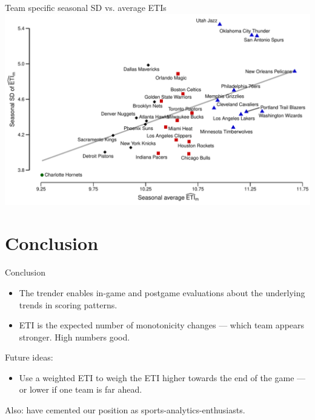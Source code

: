 \documentclass[ignorenonframetext,xcolor=pdflatex,table,dvipsnames,serif]{beamer}
\begin{document}
\begin{frame}{Team specific seasonal SD vs. average ETIs}
\includegraphics[scale=0.5]{fig5.pdf}
\end{frame}

\section{Conclusion}

\begin{frame}{Conclusion}

  \begin{itemize}
  \item The trender enables in-game and postgame evaluations about the underlying trends in scoring patterns.
    \item ETI is the expected number of monotonicity changes --- which team appears stronger. High numbers good.
  \end{itemize}

  Future ideas:
  
  \begin{itemize}
    \item Use a weighted ETI to weigh the ETI higher towards the end of the game --- or lower if one team is far ahead.
  \end{itemize}


  Also: have cemented our position as sports-analytics-enthusiasts.
  
\end{frame}
\end{document}
